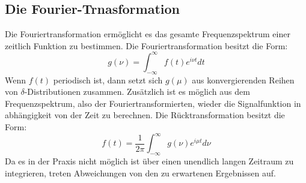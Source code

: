 \subsection{Die Fourier-Trnasformation}
Die Fouriertransformation ermöglicht es das gesamte Frequenzspektrum einer zeitlich Funktion zu bestimmen.
Die Fouriertransformation besitzt die Form:
\begin{equation}
  g(\nu)=\int_{-\infty}^{\infty}f(t)e^{i\nu t} dt
\end{equation}
Wenn $f(t)$ periodisch ist, dann setzt sich $g(\mu)$ aus konvergierenden Reihen von $\delta$-Distributionen zusammen.
Zusätzlich ist es möglich aus dem Frequenzspektrum, also der Fouriertransformierten, wieder die Signalfunktion in abhängigkeit von der Zeit zu berechnen.
Die Rücktransformation besitzt die Form:
\begin{equation}
  f(t)= \frac{1}{2\pi}\int_{-\infty}^{\infty} g(\nu) e^{i\mu t} d\nu
\end{equation}
Da es in der Praxis nicht möglich ist über einen unendlich langen Zeitraum zu integrieren, treten Abweichungen von den zu erwartenen Ergebnissen auf.

